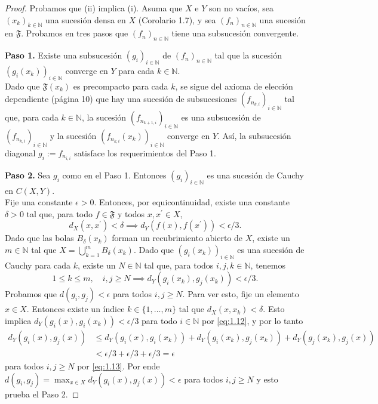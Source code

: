 \begin{proof}
Probamos que (ii) implica (i). Asuma que $X$ e $Y$ son no vacíos, sea $(x_{k})_{k\in\mathbb{N}}$ una sucesión densa en $X$ (Corolario 1.7), y sea $(f_{n})_{n\in\mathbb{N}}$ una sucesión en $\mathfrak{F}$. Probamos en tres pasos que $(f_{n})_{n\in\mathbb{N}}$ tiene una subsucesión convergente.

\noindent \textbf{Paso 1.} Existe una subsucesión $(g_{i})_{i\in\mathbb{N}}$ de $(f_{n})_{n\in\mathbb{N}}$ tal que la sucesión $(g_{i}(x_{k}))_{i\in\mathbb{N}}$ converge en $Y$ para cada $k\in\mathbb{N}$.
\\ Dado que $\mathfrak{F}(x_{k})$ es precompacto para cada $k$, se sigue del axioma de elección dependiente (página 10) que hay una sucesión de subsucesiones $(f_{n_{k,i}})_{i\in\mathbb{N}}$ tal que, para cada $k\in\mathbb{N}$, la sucesión $(f_{n_{k+1,i}})_{i\in\mathbb{N}}$ es una subsucesión de $(f_{n_{k,i}})_{i\in\mathbb{N}}$ y la sucesión $(f_{n_{k,i}}(x_{k}))_{i\in\mathbb{N}}$ converge en $Y$. Así, la subsucesión diagonal $g_{i}:=f_{n_{i,i}}$ satisface los requerimientos del Paso 1.

\noindent \textbf{Paso 2.} Sea $g_{i}$ como en el Paso 1. Entonces $(g_{i})_{i\in\mathbb{N}}$ es una sucesión de Cauchy en $C(X,Y)$.
\\ Fije una constante $\epsilon>0$. Entonces, por equicontinuidad, existe una constante $\delta>0$ tal que, para todo $f\in\mathfrak{F}$ y todos $x, x^{\prime}\in X$,
\begin{equation}\label{eq:1.12}
d_{X}(x,x^{\prime})<\delta \implies d_{Y}(f(x), f(x^{\prime}))<\epsilon/3.
\end{equation}
Dado que las bolas $B_{\delta}(x_{k})$ forman un recubrimiento abierto de $X$, existe un $m\in\mathbb{N}$ tal que $X=\bigcup_{k=1}^{m}B_{\delta}(x_{k})$. Dado que $(g_{i}(x_{k}))_{i\in\mathbb{N}}$ es una sucesión de Cauchy para cada $k$, existe un $N\in\mathbb{N}$ tal que, para todos $i, j, k\in\mathbb{N}$, tenemos
\begin{equation}\label{eq:1.13}
1\le k\le m, \quad i,j\ge N \implies d_{Y}(g_{i}(x_{k}),g_{j}(x_{k}))<\epsilon/3.
\end{equation}
Probamos que $d(g_{i},g_{j})<\epsilon$ para todos $i, j\ge N$. Para ver esto, fije un elemento $x\in X$. Entonces existe un índice $k\in\{1,\dots,m\}$ tal que $d_{X}(x,x_{k})<\delta$. Esto implica $d_{Y}(g_{i}(x),g_{i}(x_{k}))<\epsilon/3$ para todo $i\in\mathbb{N}$ por \eqref{eq:1.12}, y por lo tanto
\begin{align*}
d_{Y}(g_{i}(x),g_{j}(x)) &\le d_{Y}(g_{i}(x),g_{i}(x_{k}))+d_{Y}(g_{i}(x_{k}),g_{j}(x_{k}))+d_{Y}(g_{j}(x_{k}),g_{j}(x)) \\
&< \epsilon/3+\epsilon/3+\epsilon/3 = \epsilon
\end{align*}
para todos $i, j\ge N$ por \eqref{eq:1.13}. Por ende $d(g_{i},g_{j})=\max_{x\in X}d_{Y}(g_{i}(x),g_{j}(x))<\epsilon$ para todos $i, j\ge N$ y esto prueba el Paso 2.


\end{proof}
